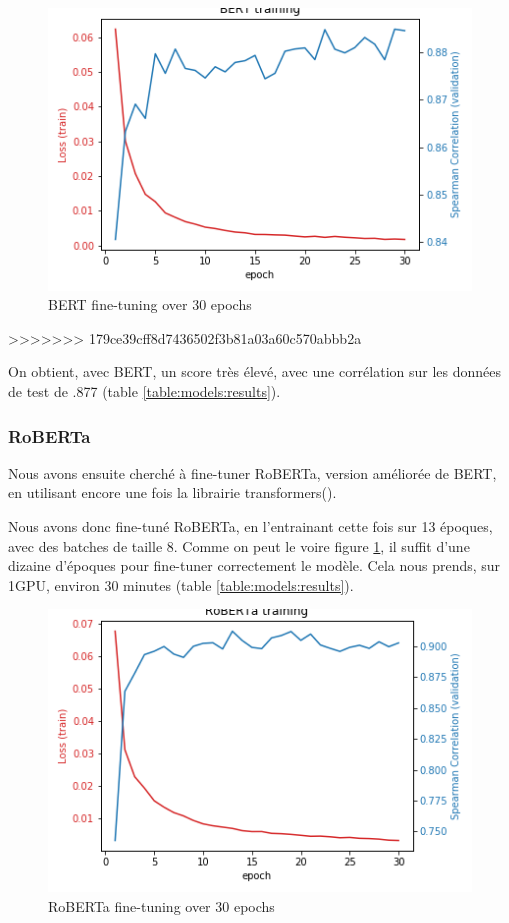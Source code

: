 \documentclass[11pt,a4paper, french]{article}
\begin{document}
\begin{figure}
  \includegraphics[width=\linewidth]{resources/bert-training.png}
  \caption{BERT fine-tuning over 30 epochs}
  \label{fig:BERT:finetunning}
\end{figure}
>>>>>>> 179ce39cff8d7436502f3b81a03a60c570abbb2a

On obtient, avec BERT, un score très élevé, avec une corrélation sur les données de test de .877 (table \ref{table:models:results}).

%
\subsubsection{RoBERTa}

Nous avons ensuite cherché à fine-tuner RoBERTa, version améliorée de BERT, en utilisant encore une fois la librairie transformers(\cite{huggingface}).

Nous avons donc fine-tuné RoBERTa, en l'entrainant cette fois sur 13 époques, avec des batches de taille 8. Comme on peut le voire figure \ref{fig:BERT:finetunning}, il suffit d'une dizaine d'époques pour fine-tuner correctement le modèle. Cela nous prends, sur 1GPU, environ 30 minutes (table \ref{table:models:results}).

\begin{figure}
  \includegraphics[width=\linewidth]{resources/roberta-training.png}
  \caption{RoBERTa fine-tuning over 30 epochs}
  \label{fig:RoBERTa:finetunning}
\end{figure}
\end{document}
